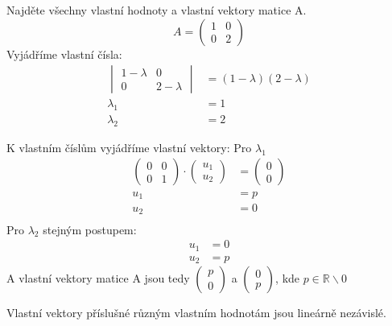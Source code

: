 \begin{example}
    Najděte všechny vlastní hodnoty a vlastní vektory matice A.
    \[A =
        \begin{pmatrix}
            1 & 0 \\
            0 & 2
        \end{pmatrix}
    \]
Vyjádříme vlastní čísla:
    \begin{align*}
        \begin{vmatrix}
            1 - \lambda & 0 \\
            0 & 2 - \lambda
        \end{vmatrix} &= (1 - \lambda)(2 - \lambda)\\
        \lambda_1 &= 1\\
        \lambda_2 &= 2
    \end{align*}

K vlastním číslům vyjádříme vlastní vektory:
Pro $\lambda_1$
\begin{align*}
    \begin{pmatrix}
        0 & 0\\
        0 & 1
    \end{pmatrix} \cdot
    \begin{pmatrix}
        u_1\\
        u_2
    \end{pmatrix} &=
    \begin{pmatrix}
        0 \\
        0
    \end{pmatrix}\\
    u_1 &= p\\
    u_2 &= 0\\
\end{align*}
Pro $\lambda_2$ stejným postupem:
\begin{align*}
    u_1 &= 0\\
    u_2 &= p
\end{align*}
A vlastní vektory matice A jsou tedy $
\begin{pmatrix}
    p\\0
\end{pmatrix}$ a $
\begin{pmatrix}
    0\\p
\end{pmatrix}
$, kde $p\in \mathbb{R} \smallsetminus 0$
\end{example}

\begin{theorem}
    Vlastní vektory příslušné různým vlastním hodnotám jsou lineárně nezávislé.
\end{theorem}

